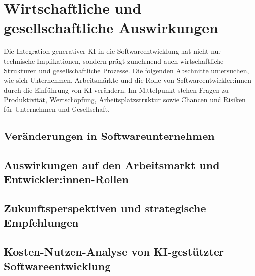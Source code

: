 \chapter{Wirtschaftliche und gesellschaftliche Auswirkungen}
\label{chap:wirtschaftliche_und_gesellschaftliche_auswirkungen}
Die Integration generativer KI in die Softwareentwicklung hat nicht nur technische Implikationen, sondern prägt zunehmend auch wirtschaftliche Strukturen und gesellschaftliche Prozesse. Die folgenden Abschnitte untersuchen, wie sich Unternehmen, Arbeitsmärkte und die Rolle von Softwareentwickler:innen durch die Einführung von KI verändern. Im Mittelpunkt stehen Fragen zu Produktivität, Wertschöpfung, Arbeitsplatzstruktur sowie Chancen und Risiken für Unternehmen und Gesellschaft.

\section{Veränderungen in Softwareunternehmen}


\section{Auswirkungen auf den Arbeitsmarkt und Entwickler:innen-Rollen}


\section{Zukunftsperspektiven und strategische Empfehlungen}


\section{Kosten-Nutzen-Analyse von KI-gestützter Softwareentwicklung}





